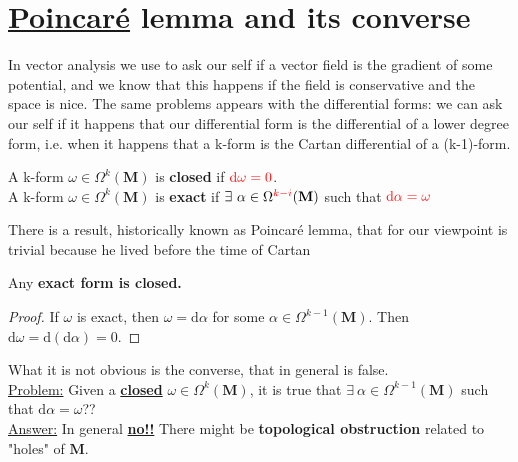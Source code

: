 \documentclass[../main.tex]{subfiles}
\begin{document}
\section{\href{https://it.wikipedia.org/wiki/Henri_Poincar\%C3\%A9}{Poincaré} lemma and its converse}
\label{Poincaré}
In vector analysis we use to ask our self if a vector field is the gradient of some potential, and we know that this happens if the field is conservative and the space is nice. The same problems appears with the differential forms: we can ask our self if it happens that our differential form is the differential of a lower degree form, i.e. when it happens that a k-form is the Cartan differential of a (k-1)-form.
\begin{kaobox}[frametitle=Terminology]
A k-form $\omega\in\Omega^k(\mathbf{M})$ is \textbf{closed} if ${\color{red}\textrm{d}\omega=0}$.\\
A k-form $\omega\in\Omega^k(\mathbf{M})$ is \textbf{exact} if $\exists \ \alpha\in\Omega^{\color{red}k-i}(\mathbf{M})$ such that ${\color{red}\textrm{d}\alpha=\omega}$
\end{kaobox}
There is a result, historically known as Poincaré lemma, that for our viewpoint is trivial because he lived before the time of Cartan
\begin{lemma}
Any \textbf{exact form is closed.}
\end{lemma}
\begin{proof}
If $\omega$ is exact, then $\omega = \textrm{d}\alpha$ for some $\alpha\in\Omega^{k-1}(\mathbf{M})$. Then $\textrm{d}\omega=\textrm{d}\left(\textrm{d}\alpha\right)=0$.
\end{proof}
What it is not obvious is the converse, that in general is false.\\
\underline{Problem:} Given a \textbf{\underline{closed}} $\omega\in\Omega^k(\mathbf{M})$, it is true that $\exists \ \alpha \in \Omega^{k-1}(\mathbf{M})$ such that $\textrm{d}\alpha=\omega$??\\
\underline{Answer:} In general \underline{\textbf{no!!}} There might be \textbf{topological obstruction} related to "holes" of $\mathbf{M}$.\\
\end{document}
